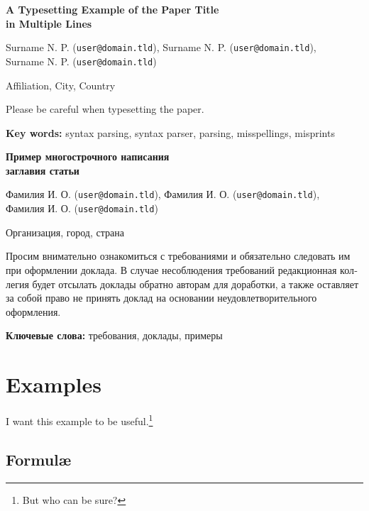 \documentclass{dialogue}
\begin{document}
\begin{otherlanguage}{english}
\begin{center}
{\Large\bfseries{A Typesetting Example of the Paper Title\\in Multiple Lines}}

\medskip

Surname N. P. (\texttt{user@domain.tld}), Surname N. P. (\texttt{user@domain.tld}),\\Surname N. P. (\texttt{user@domain.tld})

\medskip

Affiliation, City, Country
\end{center}

Please be careful when typesetting the paper.\medskip

\textbf{Key words:} syntax parsing, syntax parser, parsing, misspellings, misprints
\end{otherlanguage}

\bigskip

\begin{otherlanguage}{russian}
\begin{center}
{\Large\bfseries{Пример многострочного написания\\заглавия статьи}}

\medskip

Фамилия И. О. (\texttt{user@domain.tld}), Фамилия И. О. (\texttt{user@domain.tld}),\\Фамилия И. О. (\texttt{user@domain.tld})

\medskip

Организация, город, страна
\end{center}

Просим внимательно ознакомиться с требованиями и обязательно следовать им при оформлении доклада. В случае несоблюдения требований редакционная коллегия будет отсылать доклады обратно авторам для доработки, а также оставляет за собой право не принять доклад на основании неудовлетворительного оформления.\medskip

\textbf{Ключевые слова:} требования, доклады, примеры
\end{otherlanguage}

\section{Examples}

I want this example to be useful.\footnote{But who can be sure?}

\subsection{Formul\ae}
\end{document}
